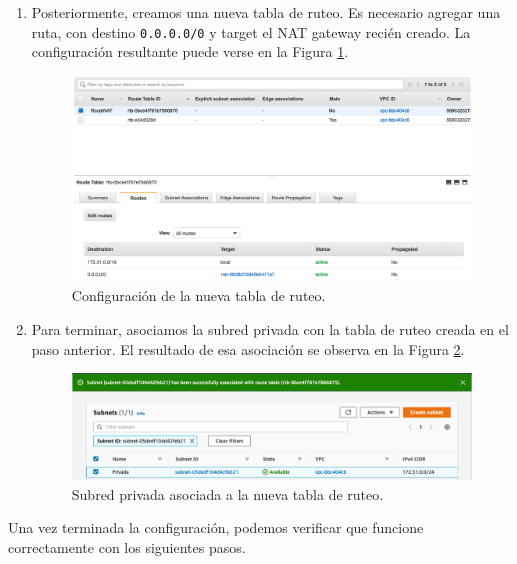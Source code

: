 \documentclass{article}
\newcommand{\ttt}[1]{%
\texttt{#1}%
}
\begin{document}
\begin{enumerate}
  \item Posteriormente, creamos una nueva tabla de
    ruteo.   Es necesario agregar una ruta, con destino
    \ttt{0.0.0.0/0} y target el NAT gateway reci\'en
    creado.   La configuraci\'on resultante puede
    verse en la Figura \ref{fig:NAT-routeTable}.
    \begin{figure}[H]
      \centering
      \includegraphics[width=\textwidth]{SSNAT/routeTable}
      \caption{Configuraci\'on de la nueva tabla de ruteo.}
      \label{fig:NAT-routeTable}
    \end{figure}

  \item Para terminar, asociamos la subred privada con
    la tabla de ruteo creada en el paso anterior. El
    resultado de esa asociaci\'on se observa en la Figura
    \ref{fig:subnetRouteTable}.
    \begin{figure}[H]
      \centering
      \includegraphics[width=\textwidth]{SSNAT/subnetRouteTable}
      \caption{Subred privada asociada a la nueva tabla
      de ruteo.}
      \label{fig:subnetRouteTable}
    \end{figure}
\end{enumerate}

Una vez terminada la configuraci\'on, podemos verificar
que funcione correctamente con los siguientes pasos.
\end{document}
